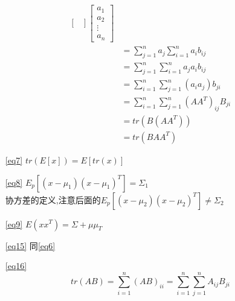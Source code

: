 \documentclass[UTF8,a4paper]{ctexart}
\begin{document}
\begin{itemize}
\begin{small}
\begin{align}
\begin{bmatrix}
          \end{bmatrix}
          \begin{bmatrix}
            a_1 \\  a_2 \\  \vdots \\ a_n
          \end{bmatrix}\\
        &= \sum_{j = 1}^n a_j \sum_{i = 1}^n a_ib_{ij} \\
        &= \sum_{j = 1}^n \sum_{i = 1}^n a_ja_ib_{ij} \\
        &= \sum_{i = 1}^n \sum_{j = 1}^n \left (a_ia_j \right )b_{ji} \\
        &= \sum_{i = 1}^n \sum_{j = 1}^n \left (AA^T\right)_{ij}B_{ji} \\
        &= tr\left (B\left(AA^T\right)\right)\\
        &= tr\left (BAA^T\right) \label{eq16}
    \end{align}\end{small}
  \item[\eqref{eq7}] $\boxed{tr\left( E\left[ x\right] \right) =  E\left[tr\left( x \right) \right]}$\\
  \item[\eqref{eq8}] $\boxed{E_p\left[ \left( x - \mu_1 \right)\left( x - \mu_1 \right)^T \right] = \Sigma_1}$\\
    协方差的定义,注意后面的$E_p\left[ \left( x - \mu_2 \right)\left( x - \mu_2 \right)^T \right] \neq \Sigma_2$
  \item[\eqref{eq9}] $\boxed{E(xx^T) = \Sigma + \mu\mu_T}$\\
  \item[\eqref{eq15}]  同\eqref{eq6}
  \item[\eqref{eq16}]
    \[\boxed{ tr\left( AB\right) = \sum_{i = 1}^n(AB)_{ii} = \sum_{i = 1}^n\sum_{j = 1}^nA_{ij}B_{ji} }\]
\end{itemize}
\end{document}
